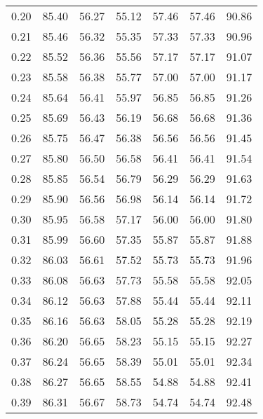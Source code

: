\begin{tabular}{|c|c|c|c|c|c|c|}
      0.20 &     85.40 &     56.27 &      55.12 &   57.46 &      57.46 &         90.86 \\
      0.21 &     85.46 &     56.32 &      55.35 &   57.33 &      57.33 &         90.96 \\
      0.22 &     85.52 &     56.36 &      55.56 &   57.17 &      57.17 &         91.07 \\
      0.23 &     85.58 &     56.38 &      55.77 &   57.00 &      57.00 &         91.17 \\
      0.24 &     85.64 &     56.41 &      55.97 &   56.85 &      56.85 &         91.26 \\
      0.25 &     85.69 &     56.43 &      56.19 &   56.68 &      56.68 &         91.36 \\
      0.26 &     85.75 &     56.47 &      56.38 &   56.56 &      56.56 &         91.45 \\
      0.27 &     85.80 &     56.50 &      56.58 &   56.41 &      56.41 &         91.54 \\
      0.28 &     85.85 &     56.54 &      56.79 &   56.29 &      56.29 &         91.63 \\
      0.29 &     85.90 &     56.56 &      56.98 &   56.14 &      56.14 &         91.72 \\
      0.30 &     85.95 &     56.58 &      57.17 &   56.00 &      56.00 &         91.80 \\
      0.31 &     85.99 &     56.60 &      57.35 &   55.87 &      55.87 &         91.88 \\
      0.32 &     86.03 &     56.61 &      57.52 &   55.73 &      55.73 &         91.96 \\
      0.33 &     86.08 &     56.63 &      57.73 &   55.58 &      55.58 &         92.05 \\
      0.34 &     86.12 &     56.63 &      57.88 &   55.44 &      55.44 &         92.11 \\
      0.35 &     86.16 &     56.63 &      58.05 &   55.28 &      55.28 &         92.19 \\
      0.36 &     86.20 &     56.65 &      58.23 &   55.15 &      55.15 &         92.27 \\
      0.37 &     86.24 &     56.65 &      58.39 &   55.01 &      55.01 &         92.34 \\
      0.38 &     86.27 &     56.65 &      58.55 &   54.88 &      54.88 &         92.41 \\
      0.39 &     86.31 &     56.67 &      58.73 &   54.74 &      54.74 &         92.48 \\

\end{tabular}
